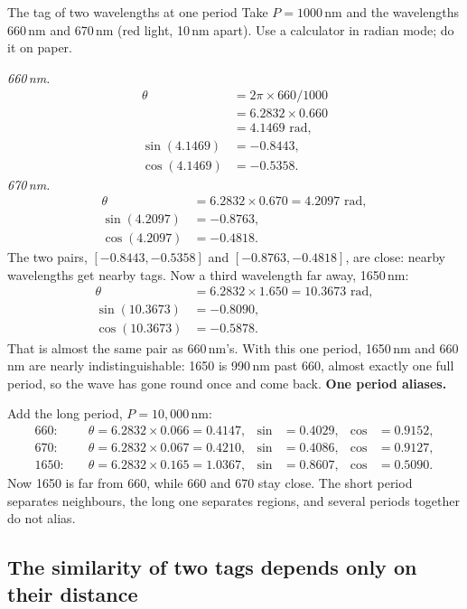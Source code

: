 \begin{worked}[label={we:ceiling:enc1000}]{The tag of two wavelengths at one period}
Take $P = 1000$\,nm and the wavelengths 660\,nm and 670\,nm (red light, 10\,nm apart). Use a calculator in radian mode; do it on paper.

\emph{660\,nm.}
\begin{align*}
  \theta &= 2\pi\times660/1000\\
         &= 6.2832\times0.660\\
         &= 4.1469 \text{ rad},\\
  \sin(4.1469) &= -0.8443,\\
  \cos(4.1469) &= -0.5358 .
\end{align*}
\emph{670\,nm.}
\begin{align*}
  \theta &= 6.2832\times0.670 = 4.2097 \text{ rad},\\
  \sin(4.2097) &= -0.8763,\\
  \cos(4.2097) &= -0.4818 .
\end{align*}
The two pairs, $[-0.8443, -0.5358]$ and $[-0.8763, -0.4818]$, are close: nearby wavelengths get nearby tags. Now a third wavelength far away, 1650\,nm:
\begin{align*}
  \theta &= 6.2832\times1.650 = 10.3673 \text{ rad},\\
  \sin(10.3673) &= -0.8090,\\
  \cos(10.3673) &= -0.5878 .
\end{align*}
That is almost the same pair as 660\,nm's. With this one period, 1650\,nm and 660\,nm are nearly indistinguishable: 1650 is 990\,nm past 660, almost exactly one full period, so the wave has gone round once and come back. \textbf{One period aliases.}

Add the long period, $P = 10{,}000$\,nm:
\begin{align*}
  660:&\quad \theta = 6.2832\times0.066 = 0.4147, & \sin &= 0.4029, & \cos &= 0.9152,\\
  670:&\quad \theta = 6.2832\times0.067 = 0.4210, & \sin &= 0.4086, & \cos &= 0.9127,\\
  1650:&\quad \theta = 6.2832\times0.165 = 1.0367, & \sin &= 0.8607, & \cos &= 0.5090.
\end{align*}
Now 1650 is far from 660, while 660 and 670 stay close. The short period separates neighbours, the long one separates regions, and several periods together do not alias.
\end{worked}

\subsection{The similarity of two tags depends only on their distance}

